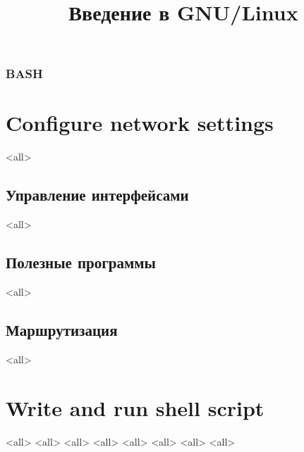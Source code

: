 
\title{Введение в GNU/Linux}




\begin{frame}
	\frametitle{BASH}
	\titlepage
	\vspace{-0.5cm}
	\begin{center}
	\end{center}
\end{frame}

\begin{frame}
	\tableofcontents
\end{frame}




\section{Configure network settings}
\mode<all>{} %

\subsection{Управление интерфейсами}
\mode<all>{}

\subsection{Полезные программы}
\mode<all>{}

\subsection{Маршрутизация}
\mode<all>{}

\section{Write and run shell script}
\mode<all>{}
\mode<all>{}
\mode<all>{}
\mode<all>{}
\mode<all>{}
\mode<all>{}
\mode<all>{}
\mode<all>{}


